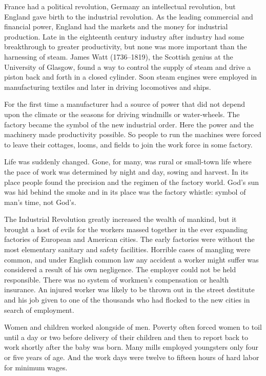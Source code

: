 France had a political revolution, Germany an intellectual revolution, but England gave birth to the
industrial revolution. As the leading commercial and financial power, England had the markets and
the money for industrial production. Late in the eighteenth century industry after industry had some
breakthrough to greater productivity, but none was more important than the harnessing of steam.
James Watt (1736–1819), the Scottish genius at the University of Glasgow, found a way to control the
supply of steam and drive a piston back and forth in a closed cylinder. Soon steam engines were
employed in manufacturing textiles and later in driving locomotives and ships.

For the first time a manufacturer had a source of power that did not depend upon the climate or the
seasons for driving windmills or water-wheels. The factory became the symbol of the new industrial
order. Here the power and the machinery made productivity possible. So people to run the machines
were forced to leave their cottages, looms, and fields to join the work force in some factory.

Life was suddenly changed. Gone, for many, was rural or small-town life where the pace of work was
determined by night and day, sowing and harvest. In its place people found the precision and the
regimen of the factory world. God’s sun was hid behind the smoke and in its place was the factory
whistle: symbol of man’s time, not God’s.

The Industrial Revolution greatly increased the wealth of mankind, but it brought a host of evils
for the workers massed together in the ever expanding factories of European and American cities. The
early factories were without the most elementary sanitary and safety facilities. Horrible cases of
mangling were common, and under English common law any accident a worker might suffer was considered
a result of his own negligence. The employer could not be held responsible. There was no system of
workmen’s compensation or health insurance. An injured worker was likely to be thrown out in the
street destitute and his job given to one of the thousands who had flocked to the new cities in
search of employment.

Women and children worked alongside of men. Poverty often forced women to toil until a day or two
before delivery of their children and then to report back to work shortly after the baby was born.
Many mills employed youngsters only four or five years of age. And the work days were twelve to
fifteen hours of hard labor for minimum wages.

